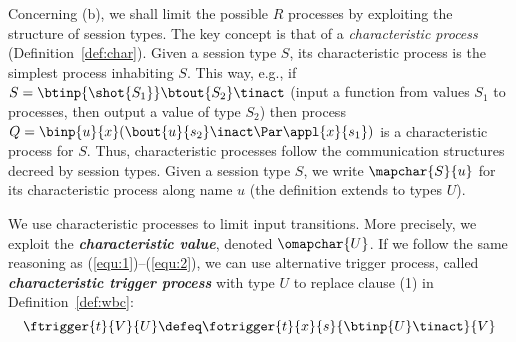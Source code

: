 
Concerning (b), we shall limit the possible $R$ processes by
exploiting the structure of session types.
The key concept is that of a \emph{characteristic process} (Definition~\ref{def:char}). 
Given a session type $S$, its characteristic process is the 
simplest process inhabiting $S$. 
This way, e.g., if $S = \btinp{\shot{S_1}} \btout{S_2} \tinact$
(input a function from values $S_1$ to processes, then output a value of type $S_2$)
then process $Q = \binp{u}{x} (\bout{u}{s_2} \inact \Par \appl{x}{s_1})$
is a characteristic process for $S$.
Thus, characteristic processes follow the communication structures decreed by session types.
Given a session type $S$, we write $\mapchar{S}{u} $ for its characteristic process along name $u$ (the definition
extends to types $U$).

We use characteristic processes to limit input transitions.
More precisely, we exploit  the
{\bf\em characteristic value}, denoted $\omapchar{U}$. %
If we follow the same reasoning as (\ref{equ:1})--(\ref{equ:2}), 
we can use alternative trigger process, called
{\bf\em characteristic trigger process} with type 
$U$ to replace clause (1) in Definition~\ref{def:wbc}:
\begin{equation}
	\label{eq:4}
	\ftrigger{t}{V}{U} \defeq \fotrigger{t}{x}{s}{\btinp{U} \tinact}{V}
\end{equation}


